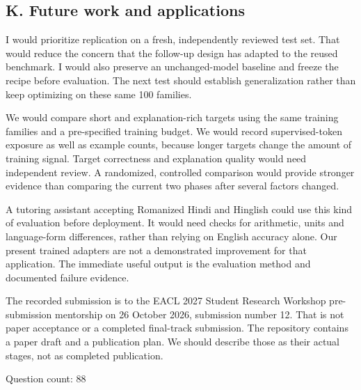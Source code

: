 \subsection*{K. Future work and applications}


\medskip{}\par\nopagebreak

I would prioritize replication on a fresh, independently reviewed test set. That would reduce the concern that the follow-up design has adapted to the reused benchmark. I would also preserve an unchanged-model baseline and freeze the recipe before evaluation. The next test should establish generalization rather than keep optimizing on these same 100 families.

\medskip{}\par\nopagebreak

We would compare short and explanation-rich targets using the same training families and a pre-specified training budget. We would record supervised-token exposure as well as example counts, because longer targets change the amount of training signal. Target correctness and explanation quality would need independent review. A randomized, controlled comparison would provide stronger evidence than comparing the current two phases after several factors changed.

\medskip{}\par\nopagebreak

A tutoring assistant accepting Romanized Hindi and Hinglish could use this kind of evaluation before deployment. It would need checks for arithmetic, units and language-form differences, rather than relying on English accuracy alone. Our present trained adapters are not a demonstrated improvement for that application. The immediate useful output is the evaluation method and documented failure evidence.

\medskip{}\par\nopagebreak

The recorded submission is to the EACL 2027 Student Research Workshop pre-submission mentorship on 26 October 2026, submission number 12. That is not paper acceptance or a completed final-track submission. The repository contains a paper draft and a publication plan. We should describe those as their actual stages, not as completed publication.

Question count: 88
